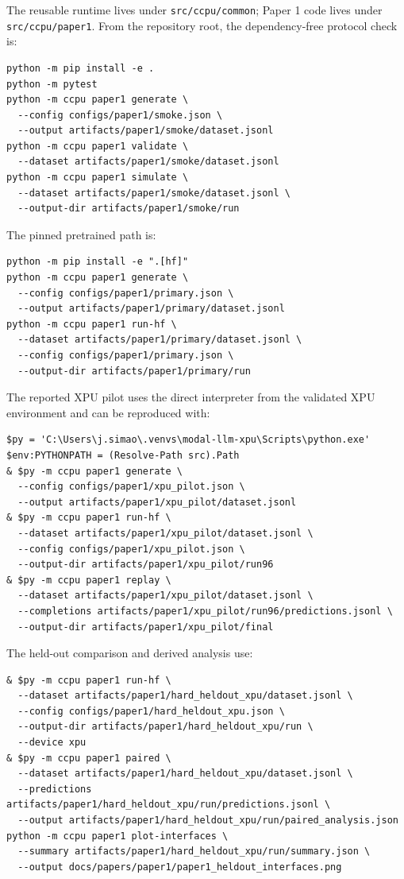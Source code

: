\documentclass[11pt]{article}
\begin{document}
The reusable runtime lives under \texttt{src/ccpu/common}; Paper 1 code lives
under \texttt{src/ccpu/paper1}. From the repository root, the dependency-free
protocol check is:

\begin{verbatim}
python -m pip install -e .
python -m pytest
python -m ccpu paper1 generate \
  --config configs/paper1/smoke.json \
  --output artifacts/paper1/smoke/dataset.jsonl
python -m ccpu paper1 validate \
  --dataset artifacts/paper1/smoke/dataset.jsonl
python -m ccpu paper1 simulate \
  --dataset artifacts/paper1/smoke/dataset.jsonl \
  --output-dir artifacts/paper1/smoke/run
\end{verbatim}

The pinned pretrained path is:

\begin{verbatim}
python -m pip install -e ".[hf]"
python -m ccpu paper1 generate \
  --config configs/paper1/primary.json \
  --output artifacts/paper1/primary/dataset.jsonl
python -m ccpu paper1 run-hf \
  --dataset artifacts/paper1/primary/dataset.jsonl \
  --config configs/paper1/primary.json \
  --output-dir artifacts/paper1/primary/run
\end{verbatim}

The reported XPU pilot uses the direct interpreter from the validated XPU
environment and can be reproduced with:

\begin{verbatim}
$py = 'C:\Users\j.simao\.venvs\modal-llm-xpu\Scripts\python.exe'
$env:PYTHONPATH = (Resolve-Path src).Path
& $py -m ccpu paper1 generate \
  --config configs/paper1/xpu_pilot.json \
  --output artifacts/paper1/xpu_pilot/dataset.jsonl
& $py -m ccpu paper1 run-hf \
  --dataset artifacts/paper1/xpu_pilot/dataset.jsonl \
  --config configs/paper1/xpu_pilot.json \
  --output-dir artifacts/paper1/xpu_pilot/run96
& $py -m ccpu paper1 replay \
  --dataset artifacts/paper1/xpu_pilot/dataset.jsonl \
  --completions artifacts/paper1/xpu_pilot/run96/predictions.jsonl \
  --output-dir artifacts/paper1/xpu_pilot/final
\end{verbatim}

The held-out comparison and derived analysis use:

\begin{verbatim}
& $py -m ccpu paper1 run-hf \
  --dataset artifacts/paper1/hard_heldout_xpu/dataset.jsonl \
  --config configs/paper1/hard_heldout_xpu.json \
  --output-dir artifacts/paper1/hard_heldout_xpu/run \
  --device xpu
& $py -m ccpu paper1 paired \
  --dataset artifacts/paper1/hard_heldout_xpu/dataset.jsonl \
  --predictions artifacts/paper1/hard_heldout_xpu/run/predictions.jsonl \
  --output artifacts/paper1/hard_heldout_xpu/run/paired_analysis.json
python -m ccpu paper1 plot-interfaces \
  --summary artifacts/paper1/hard_heldout_xpu/run/summary.json \
  --output docs/papers/paper1/paper1_heldout_interfaces.png
\end{verbatim}
\end{document}
